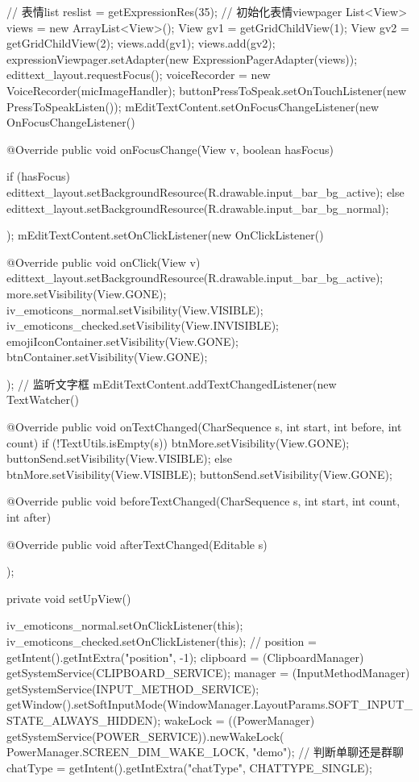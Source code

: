 {{		// 表情list
		reslist = getExpressionRes(35);
		// 初始化表情viewpager
		List<View> views = new ArrayList<View>();
		View gv1 = getGridChildView(1);
		View gv2 = getGridChildView(2);
		views.add(gv1);
		views.add(gv2);
		expressionViewpager.setAdapter(new ExpressionPagerAdapter(views));
		edittext_layout.requestFocus();
		voiceRecorder = new VoiceRecorder(micImageHandler);
		buttonPressToSpeak.setOnTouchListener(new PressToSpeakListen());
		mEditTextContent.setOnFocusChangeListener(new OnFocusChangeListener() {

			@Override
			public void onFocusChange(View v, boolean hasFocus) {
				if (hasFocus) {
					edittext_layout.setBackgroundResource(R.drawable.input_bar_bg_active);
				} else {
					edittext_layout.setBackgroundResource(R.drawable.input_bar_bg_normal);
				}

			}
		});
		mEditTextContent.setOnClickListener(new OnClickListener() {

			@Override
			public void onClick(View v) {
				edittext_layout.setBackgroundResource(R.drawable.input_bar_bg_active);
				more.setVisibility(View.GONE);
				iv_emoticons_normal.setVisibility(View.VISIBLE);
				iv_emoticons_checked.setVisibility(View.INVISIBLE);
				emojiIconContainer.setVisibility(View.GONE);
				btnContainer.setVisibility(View.GONE);
			}
		});
		// 监听文字框
		mEditTextContent.addTextChangedListener(new TextWatcher() {

			@Override
			public void onTextChanged(CharSequence s, int start, int before, int count) {
				if (!TextUtils.isEmpty(s)) {
					btnMore.setVisibility(View.GONE);
					buttonSend.setVisibility(View.VISIBLE);
				} else {
					btnMore.setVisibility(View.VISIBLE);
					buttonSend.setVisibility(View.GONE);
				}
			}

			@Override
			public void beforeTextChanged(CharSequence s, int start, int count, int after) {
			}

			@Override
			public void afterTextChanged(Editable s) {

			}
		});

	}

	private void setUpView() {
		iv_emoticons_normal.setOnClickListener(this);
		iv_emoticons_checked.setOnClickListener(this);
		// position = getIntent().getIntExtra("position", -1);
		clipboard = (ClipboardManager) getSystemService(CLIPBOARD_SERVICE);
		manager = (InputMethodManager) getSystemService(INPUT_METHOD_SERVICE);
		getWindow().setSoftInputMode(WindowManager.LayoutParams.SOFT_INPUT_STATE_ALWAYS_HIDDEN);
		wakeLock = ((PowerManager) getSystemService(POWER_SERVICE)).newWakeLock(
				PowerManager.SCREEN_DIM_WAKE_LOCK, "demo");
		// 判断单聊还是群聊
		chatType = getIntent().getIntExtra("chatType", CHATTYPE_SINGLE);

}}
